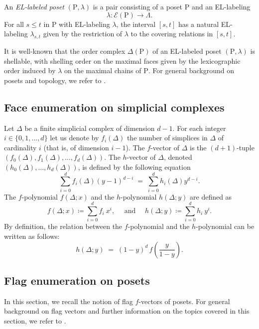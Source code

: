 \documentclass[11pt,a4paper]{amsart}
\theoremstyle{results}
\theoremstyle{definitions}
\def\P{\mathbb{P}}
\newcommand{\Edge}{\mathcal{E}}
\renewcommand{\P}{\mathrm{P}}
\begin{document}
An \emph{EL-labeled poset} $(\P,\lambda)$ is a pair consisting of a poset $\P$ and an EL-labeling 
\[
\lambda:\Edge(\P)\rightarrow \Lambda.
\] For all $s \leqslant t$ in $\P$ with EL-labeling $\lambda$, the interval $[s,t]$ has a natural EL-labeling $\lambda_{s, t}$ given by the restriction of $\lambda$ to the covering relations in $[s,t]$.

It is well-known that the order complex $\Delta(\P)$ of an EL-labeled poset $(\P, \lambda)$ is shellable, with shelling order on the maximal faces given by the lexicographic order induced by $\lambda$ on the maximal chains of $\P$. For general background on posets and topology, we refer to \cite{wachs2007poset}. 

\subsection{Face enumeration on simplicial complexes}

Let $\Delta$ be a finite simplicial complex of dimension $d-1$. For each integer $i\in \{0,1,\ldots,d\}$ let us denote by $f_i(\Delta)$ the number of simplices in $\Delta$ of cardinality $i$ (that is, of dimension $i-1$). 
The $f$-vector of $\Delta$ is the $(d+1)$-tuple $(f_0(\Delta), f_1(\Delta), \dots, f_{d}(\Delta))$. The $h$-vector of $\Delta$, denoted $(h_0(\Delta),\ldots,h_{d}(\Delta))$, is defined by the following equation
\[
  \sum_{i=0}^d f_{i}(\Delta)(y-1)^{d-i}
  \;=\;
  \sum_{i=0}^d h_i(\Delta) y^{d-i}.
\]
The $f$-polynomial $f(\Delta; x)$ and the $h$-polynomial $h(\Delta; y)$ are defined as 
\[
  f(\Delta; x) \coloneqq \sum_{i=0}^d f_{i} \: x^i,
  \quad \text{ and } \quad
  h(\Delta; y) \coloneqq \sum_{i=0}^d h_i \: y^i.
\]
By definition, the relation between the $f$-polynomial and the $h$-polynomial can be written as follows: 
\[
  h(\Delta; y) \;=\; (1-y)^d \, f\left(\frac{y}{1-y}\right).
\]

\subsection{Flag enumeration on posets}\label{subsec:flag-enum}

In this section, we recall the notion of flag $f$-vectors of posets. For general background on flag vectors and further information on the topics covered in this section, we refer to \cite[Chapter~3]{stanley-ec1}.
\end{document}
